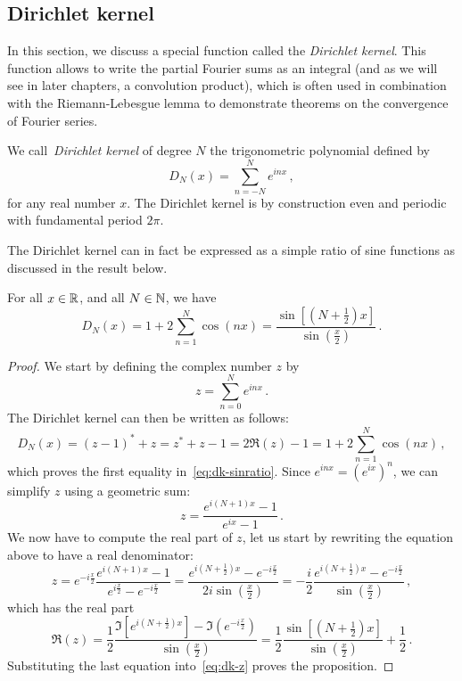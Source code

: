 \subsection{Dirichlet kernel}
In this section, we discuss a special function called the \emph{Dirichlet kernel}. This
function allows to write the partial Fourier sums as an integral (and as we will see in
later chapters, a convolution product), which is often used in combination with the
Riemann-Lebesgue lemma to demonstrate theorems on the convergence of Fourier series.
\begin{definition}
	We call~\emph{Dirichlet kernel} of degree $N$ the trigonometric polynomial defined by
	\begin{equation}
		D_N(x)=\sum_{n=-N}^{N}e^{inx}\,,\label{eq:dk-def}
	\end{equation}
	for any real number $x$. The Dirichlet kernel is by construction even and periodic with
	fundamental period $2\pi$.
\end{definition}
The Dirichlet kernel can in fact be expressed as a simple ratio of sine functions as
discussed in the result below.
\begin{proposition}
	\label{prop:dirichlet-id}
	For all $x\in\mathbb{R}$, and all $N\in\mathbb{N}$, we have
	\begin{equation}
		D_N(x)=1+2\sum_{n=1}^{N}\cos(nx)=\frac{\sin[(N+\frac{1}{2})x]}{\sin(\frac{x}{2})}\,.
		\label{eq:dk-sinratio}
	\end{equation}
\end{proposition}
\begin{proof}
	We start by defining the complex number $z$ by
	\begin{equation}
		z=\sum_{n=0}^Ne^{inx}\,.
	\end{equation}
	The Dirichlet kernel can then be written as follows:
	\begin{equation}
		D_N(x)=(z-1)^*+z=z^*+z-1=2\Re(z)-1=1+2\sum_{n=1}^{N}\cos(nx)\,,\label{eq:dk-z}
	\end{equation}
	which proves the first equality in~\cref{eq:dk-sinratio}. Since $e^{inx}=(e^{ix})^n$, we
	can simplify $z$ using a geometric sum:
	\begin{equation}
		z=\frac{e^{i(N+1)x}-1}{e^{ix}-1}\,.\label{eq:dk-geosum}
	\end{equation}
	We now have to compute the real part of $z$, let us start by rewriting the equation
	above to have a real denominator:
	\begin{equation}
		z=e^{-i\frac{x}{2}}\frac{e^{i(N+1)x}-1}{e^{i\frac{x}{2}}-e^{-i\frac{x}{2}}}
		=\frac{e^{i(N+\frac12)x}-e^{-i\frac{x}{2}}}{2i\sin(\frac{x}{2})}
		=-\frac{i}{2}\frac{e^{i(N+\frac12)x}-e^{-i\frac{x}{2}}}{\sin(\frac{x}{2})}\,,
	\end{equation}
	which has the real part
	\begin{equation}
		\Re(z)=\frac12\frac{\Im[e^{i(N+\frac12)x}]-\Im(e^{-i\frac{x}{2}})}{\sin(\frac{x}{2})}
		=\frac12\frac{\sin[(N+\frac{1}{2})x]}{\sin(\frac{x}{2})}+\frac 12\,.
	\end{equation}
	Substituting the last equation into~\cref{eq:dk-z} proves the proposition.
\end{proof}
